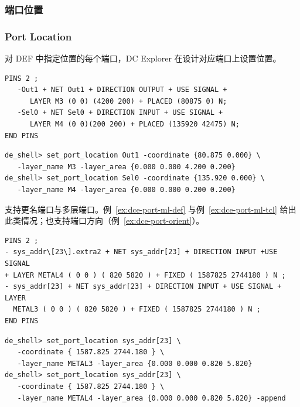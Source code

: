 \subsubsection{端口位置}
\subsubsection*{Port Location}

对 DEF 中指定位置的每个端口，DC Explorer 在设计对应端口上设置位置。

\begin{lstlisting}[caption={导入的端口位置},label={ex:dce-port-def}]
PINS 2 ;
   -Out1 + NET Out1 + DIRECTION OUTPUT + USE SIGNAL +
      LAYER M3 (0 0) (4200 200) + PLACED (80875 0) N;
   -Sel0 + NET Sel0 + DIRECTION INPUT + USE SIGNAL +
      LAYER M4 (0 0)(200 200) + PLACED (135920 42475) N;
END PINS
\end{lstlisting}

\begin{lstlisting}[caption={等价 Tcl},label={ex:dce-port-tcl}]
de_shell> set_port_location Out1 -coordinate {80.875 0.000} \
   -layer_name M3 -layer_area {0.000 0.000 4.200 0.200}
de_shell> set_port_location Sel0 -coordinate {135.920 0.000} \
   -layer_name M4 -layer_area {0.000 0.000 0.200 0.200}
\end{lstlisting}

支持更名端口与多层端口。例~\ref{ex:dce-port-ml-def} 与例~\ref{ex:dce-port-ml-tcl} 给出此类情况；也支持端口方向（例~\ref{ex:dce-port-orient}）。

\begin{lstlisting}[caption={更名与多层端口的 DEF},label={ex:dce-port-ml-def}]
PINS 2 ;
- sys_addr\[23\].extra2 + NET sys_addr[23] + DIRECTION INPUT +USE SIGNAL
+ LAYER METAL4 ( 0 0 ) ( 820 5820 ) + FIXED ( 1587825 2744180 ) N ;
- sys_addr[23] + NET sys_addr[23] + DIRECTION INPUT + USE SIGNAL + LAYER
  METAL3 ( 0 0 ) ( 820 5820 ) + FIXED ( 1587825 2744180 ) N ;
END PINS
\end{lstlisting}

\begin{lstlisting}[caption={多层端口等价 Tcl},label={ex:dce-port-ml-tcl}]
de_shell> set_port_location sys_addr[23] \
   -coordinate { 1587.825 2744.180 } \
   -layer_name METAL3 -layer_area {0.000 0.000 0.820 5.820}
de_shell> set_port_location sys_addr[23] \
   -coordinate { 1587.825 2744.180 } \
   -layer_name METAL4 -layer_area {0.000 0.000 0.820 5.820} -append
\end{lstlisting}

